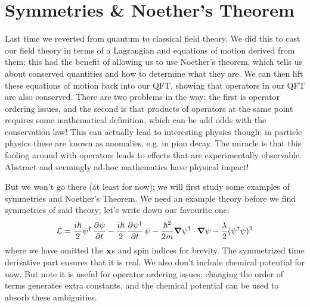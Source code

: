 \section{Symmetries \& Noether's Theorem}

Last time we reverted from quantum to classical field theory. We did this to cast our field theory in terms of a Lagrangian and equations of motion derived from them; this had the benefit of allowing us to use Noether's theorem, which tells us about conserved quantities and how to determine what they are. We can then lift these equations of motion back into our QFT, showing that operators in our QFT are also conserved. There are two problems in the way; the first is operator ordering issues, and the second is that products of operators at the same point requires some mathematical definition, which can be add odds with the conservation law! This can actually lead to interesting physics though; in particle physics these are known as anomalies, e.g. in pion decay. The miracle is that this fooling around with operators leads to effects that are experimentally observable. Abstract and seemingly ad-hoc mathematics have physical impact!

But we won't go there (at least for now); we will first study some examples of symmetries and Noether's Theorem. We need an example theory before we find symmetries of said theory; let's write down our favourite one:
\begin{equation}
    \L = \frac{i\hbar}{2}\psi^\dag \dpd{\psi}{t} - \frac{i\hbar}{2}\dpd{\psi^\dag}{t}\psi - \frac{\hbar^2}{2m}\nabla \psi^\dag \cdot \nabla \psi - \frac{\lambda}{2}(\psi^\dag \psi)^2
\end{equation}
where we have omitted the $\mathbf{x}$s and spin indices for brevity. The symmetrized time derivative part ensures that it is real. We also don't include chemical potential for now. But note it is useful for operator ordering issues; changing the order of terms generates extra constants, and the chemical potential can be used to absorb these ambiguities.

